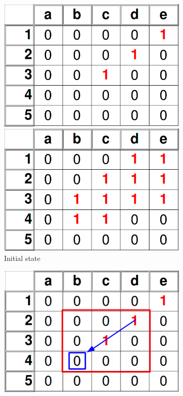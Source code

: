 \documentclass{article}
\begin{document}
\begin{figure}[htb!]
	\centering
	\begin{subfigure}{0.25\textwidth}
		\includegraphics[width=\linewidth]{thin_DNA_1.png}
		
		\vspace{0.2cm}
		
		\includegraphics[width=\linewidth]{thick_DNA_1.png}
		\caption{Initial state}
		\label{fig:end_pixel_recovery1}
	\end{subfigure}
	\begin{subfigure}{0.25\textwidth}
		\includegraphics[width=\linewidth]{thin_DNA_2.png}
		

\end{subfigure}
\end{figure}
\end{document}
